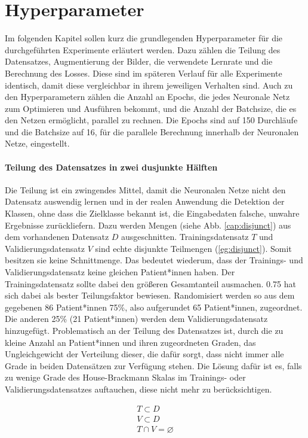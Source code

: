 \section{Hyperparameter}\label{hyper}
Im folgenden Kapitel sollen kurz die grundlegenden Hyperparameter für die durchgeführten Experimente erläutert werden. Dazu zählen die Teilung des Datensatzes, Augmentierung der Bilder, die verwendete Lernrate und die Berechnung des Losses. Diese sind im späteren Verlauf für alle Experimente identisch, damit diese vergleichbar in ihrem jeweiligen Verhalten sind. Auch zu den Hyperparametern zählen die Anzahl an Epochs, die jedes Neuronale Netz zum Optimieren und Ausführen bekommt, und die Anzahl der Batchsize, die es den Netzen ermöglicht, parallel zu rechnen. Die Epochs sind auf 150 Durchläufe und die Batchsize auf 16, für die parallele Berechnung innerhalb der Neuronalen Netze, eingestellt.

\paragraph{Teilung des Datensatzes in zwei dusjunkte Hälften} Die Teilung ist ein zwingendes Mittel, damit die Neuronalen Netze nicht den Datensatz auswendig lernen und in der realen Anwendung die Detektion der Klassen, ohne dass die Zielklasse bekannt ist, die Eingabedaten falsche, unwahre Ergebnisse zurückliefern. Dazu werden Mengen (siehe Abb. \ref{cap:disjunct}) aus dem vorhandenen Datensatz $D$ ausgeschnitten. Trainingsdatensatz $T$ und Validierungsdatensatz $V$ sind echte disjunkte  Teilmengen (\ref{eg:disjunct}). Somit besitzen sie keine Schnittmenge. Das bedeutet wiederum, dass der Trainings- und Validierungsdatensatz keine gleichen Patient*innen haben. Der Trainingsdatensatz sollte dabei den größeren Gesamtanteil ausmachen. 0.75 hat sich dabei als bester Teilungsfaktor bewiesen. Randomisiert werden so aus dem gegebenen 86 Patient*innen 75\%, also aufgerundet 65 Patient*innen, zugeordnet. Die anderen 25\% (21 Patient*innen) werden dem Validierungsdatensatz hinzugefügt. Problematisch an der Teilung des Datensatzes ist, durch die zu kleine Anzahl an Patient*innen und ihren zugeordneten Graden, das Ungleichgewicht der Verteilung dieser, die dafür sorgt, dass nicht immer alle Grade in beiden Datensätzen zur Verfügung stehen. Die Lösung dafür ist es, falls zu wenige Grade des House-Brackmann Skalas im Trainings- oder Validierungsdatensatzes  auftauchen, diese nicht mehr zu berücksichtigen.

\begin{equation}
\begin{split}
  T \subset D \\
  V \subset D \\
  T \cap V  = \varnothing
\end{split}
\label{eg:disjunct}
\end{equation}


